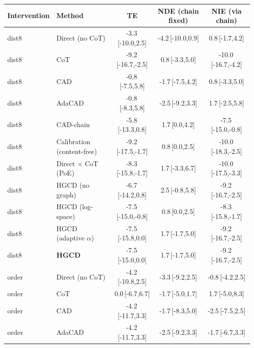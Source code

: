 \begin{tabular}{llccc}
\toprule
Intervention & Method & TE & NDE (chain fixed) & NIE (via chain) \\
\midrule
dist8 & Direct (no CoT) & -3.3\,{\scriptsize[-10.0,2.5]} & -4.2\,{\scriptsize[-10.0,0.9]} & 0.8\,{\scriptsize[-1.7,4.2]} \\
dist8 & CoT & -9.2\,{\scriptsize[-16.7,-2.5]} & 0.8\,{\scriptsize[-3.3,5.0]} & -10.0\,{\scriptsize[-16.7,-4.2]} \\
dist8 & CAD & -0.8\,{\scriptsize[-7.5,5.8]} & -1.7\,{\scriptsize[-7.5,4.2]} & 0.8\,{\scriptsize[-3.3,5.0]} \\
dist8 & AdaCAD & -0.8\,{\scriptsize[-8.3,5.8]} & -2.5\,{\scriptsize[-9.2,3.3]} & 1.7\,{\scriptsize[-2.5,5.8]} \\
dist8 & CAD-chain & -5.8\,{\scriptsize[-13.3,0.8]} & 1.7\,{\scriptsize[0.0,4.2]} & -7.5\,{\scriptsize[-15.0,-0.8]} \\
dist8 & Calibration (content-free) & -9.2\,{\scriptsize[-17.5,-1.7]} & 0.8\,{\scriptsize[0.0,2.5]} & -10.0\,{\scriptsize[-18.3,-2.5]} \\
dist8 & Direct $\times$ CoT (PoE) & -8.3\,{\scriptsize[-15.8,-1.7]} & 1.7\,{\scriptsize[-3.3,6.7]} & -10.0\,{\scriptsize[-17.5,-3.3]} \\
dist8 & HGCD (no graph) & -6.7\,{\scriptsize[-14.2,0.8]} & 2.5\,{\scriptsize[-0.8,5.8]} & -9.2\,{\scriptsize[-16.7,-2.5]} \\
dist8 & HGCD (log-space) & -7.5\,{\scriptsize[-15.0,-0.8]} & 0.8\,{\scriptsize[0.0,2.5]} & -8.3\,{\scriptsize[-15.8,-1.7]} \\
dist8 & HGCD (adaptive $\alpha$) & -7.5\,{\scriptsize[-15.8,0.0]} & 1.7\,{\scriptsize[-1.7,5.0]} & -9.2\,{\scriptsize[-16.7,-2.5]} \\
dist8 & \textbf{HGCD} & -7.5\,{\scriptsize[-15.0,0.0]} & 1.7\,{\scriptsize[-1.7,5.0]} & -9.2\,{\scriptsize[-16.7,-2.5]} \\
\midrule
order & Direct (no CoT) & -4.2\,{\scriptsize[-10.8,2.5]} & -3.3\,{\scriptsize[-9.2,2.5]} & -0.8\,{\scriptsize[-4.2,2.5]} \\
order & CoT & 0.0\,{\scriptsize[-6.7,6.7]} & -1.7\,{\scriptsize[-5.0,1.7]} & 1.7\,{\scriptsize[-5.0,8.3]} \\
order & CAD & -4.2\,{\scriptsize[-11.7,3.3]} & -1.7\,{\scriptsize[-8.3,5.0]} & -2.5\,{\scriptsize[-7.5,2.5]} \\
order & AdaCAD & -4.2\,{\scriptsize[-11.7,3.3]} & -2.5\,{\scriptsize[-9.2,3.3]} & -1.7\,{\scriptsize[-6.7,3.3]} \\

\end{tabular}
